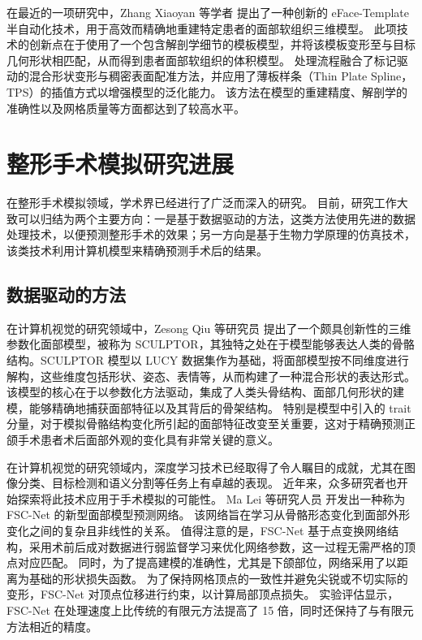 在最近的一项研究中，Zhang Xiaoyan 等学者 \cite{zhangEFacetemplateMethodEfficiently2016} 提出了一种创新的 eFace-Template 半自动化技术，用于高效而精确地重建特定患者的面部软组织三维模型。
此项技术的创新点在于使用了一个包含解剖学细节的模板模型，并将该模板变形至与目标几何形状相匹配，从而得到患者面部软组织的体积模型。
处理流程融合了标记驱动的混合形状变形与稠密表面配准方法，并应用了薄板样条（Thin Plate Spline，TPS）的插值方式以增强模型的泛化能力。
该方法在模型的重建精度、解剖学的准确性以及网格质量等方面都达到了较高水平。

\section{整形手术模拟研究进展}

在整形手术模拟领域，学术界已经进行了广泛而深入的研究。
目前，研究工作大致可以归结为两个主要方向：一是基于数据驱动的方法，这类方法使用先进的数据处理技术，以便预测整形手术的效果；另一方向是基于生物力学原理的仿真技术，该类技术利用计算机模型来精确预测手术后的结果。

\subsection{数据驱动的方法}

在计算机视觉的研究领域中，Zesong Qiu 等研究员 \cite{qiuSCULPTORSkeletonconsistentFace2022a} 提出了一个颇具创新性的三维参数化面部模型，被称为 SCULPTOR，其独特之处在于模型能够表达人类的骨骼结构。SCULPTOR 模型以 LUCY 数据集作为基础，将面部模型按不同维度进行解构，这些维度包括形状、姿态、表情等，从而构建了一种混合形状的表达形式。
该模型的核心在于以参数化方法驱动，集成了人类头骨结构、面部几何形状的建模，能够精确地捕获面部特征以及其背后的骨架结构。
特别是模型中引入的 trait 分量，对于模拟骨骼结构变化所引起的面部特征改变至关重要，这对于精确预测正颌手术患者术后面部外观的变化具有非常关键的意义。

在计算机视觉的研究领域内，深度学习技术已经取得了令人瞩目的成就，尤其在图像分类、目标检测和语义分割等任务上有卓越的表现。
近年来，众多研究者也开始探索将此技术应用于手术模拟的可能性。
Ma Lei 等研究人员 \cite{maSimulationPostoperativeFacial2023} 开发出一种称为 FSC-Net 的新型面部模型预测网络。
该网络旨在学习从骨骼形态变化到面部外形变化之间的复杂且非线性的关系。
值得注意的是，FSC-Net 基于点变换网络结构，采用术前后成对数据进行弱监督学习来优化网络参数，这一过程无需严格的顶点对应匹配。
同时，为了提高建模的准确性，尤其是下颌部位，网络采用了以距离为基础的形状损失函数。
为了保持网格顶点的一致性并避免尖锐或不切实际的变形，FSC-Net 对顶点位移进行约束，以计算局部顶点损失。
实验评估显示，FSC-Net 在处理速度上比传统的有限元方法提高了 15 倍，同时还保持了与有限元方法相近的精度。

